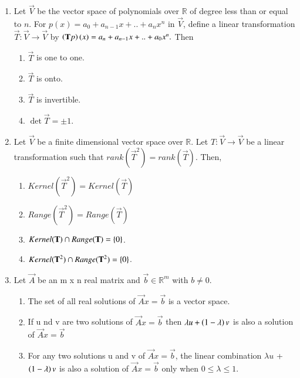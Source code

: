 \renewcommand{\theequation}{\theenumi}
\renewcommand{\thefigure}{\theenumi}
\begin{enumerate}[label=\thesection.\arabic*.,ref=\thesection.\theenumi]

\item Let $\vec{V}$ be the vector space of polynomials over $\mathbb{R}$ of degree less than or equal to $n$. For $p(x)=a_0+a_{n-1}x+..+a_nx^{n}$ in $\vec{V}$, define a linear transformation $\vec{T}:\vec{V}\rightarrow \vec{V}$ by $\left(\mathbf{T}p\right)(x)=a_n+a_{n-1}x+..+a_0x^n.$ Then \\
\begin{enumerate}
    \item $\vec{T}$ is one to one.
    \item $\vec{T}$ is onto.
    \item $\vec{T}$ is invertible.
    \item $\det{\vec{T}}=\pm 1$.
\end{enumerate}
%
%
\solution

%
\item Let $\vec{V}$ be a finite dimensional vector space over $\mathbb{R}$. Let $T:\vec{V}\rightarrow\vec{V}$ be a linear transformation such that $rank(\vec{T}^2)=rank(\vec{T})$. Then,
\begin{enumerate}
    \item $Kernel(\vec{T}^2)=Kernel(\vec{T})$
    \item $Range(\vec{T}^2)=Range(\vec{T})$
    \item $Kernel(\mathbf{T})\cap Range(\mathbf{T})=\left\{0\right\}$.
    \item $Kernel(\mathbf{T}^2)\cap Range(\mathbf{T}^2)=\left\{0\right\}$.
\end{enumerate}
%
\solution

\item  Let $\vec{A}$ be an m x n real matrix and $\vec{b}\in \mathbb{R}^m$ with $b\neq 0$.
\begin{enumerate}
    \item The set of all real solutions of $\vec{A}x=\vec{b}$ is a vector space.\\
    \item If u nd v are two solutions of $\vec{A}x=\vec{b}$ then $\lambda u  +\left(1-\lambda\right)v$ is also a solution of $\vec{A}x=\vec{b}$\\
    \item For any two solutions u and v of $\vec{A}x=\vec{b}$, the linear combination $\lambda u$ + $\left(1-\lambda\right)v$ is also a solution of $\vec{A}x=\vec{b}$ only when $0\leq\lambda\leq1.$\\

\end{enumerate}
\end{enumerate}
